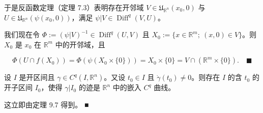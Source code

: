 \begin{theorem}
\begin{subitems}
于是反函数定理（定理 7.3）表明存在开邻域 $ V \in \mathfrak{U}_{\mathbb{R}^{n}}(x_{0}, 0) $ 与 $ U \in \mathfrak{U}_{\mathbb{R}^{n}}(\psi(x_{0}, 0)) $，满足 $ \psi|V \in \operatorname{Diff}^{q}(V, U) $。

\end{subitems}


我们现在令 $ \Phi := (\psi|V)^{-1} \in \operatorname{Diff}^{q}(U, V) $ 且 $ X_{0} := \{x \in \mathbb{R}^{m} ; \ (x, 0) \in V\} $。则 $ X_{0} $ 是 $ x_{0} $ 在 $ \mathbb{R}^{m} $ 中的开邻域，且

\[
\Phi(U \cap f(X_{0})) = \Phi(\psi(X_{0} \times \{0\})) = X_{0} \times \{0\} = V \cap (\mathbb{R}^{m} \times \{0\}) .\quad\blacksquare
\]
\end{theorem}

\begin{corollary}

设 $ I $ 是开区间且 $ \gamma \in C^{q}(I, \mathbb{R}^{n}) $。又设 $ t_{0} \in I $ 且 $ \dot{\gamma}(t_{0}) \ne 0 $。则存在 $ I $ 的含 $ t_{0} $ 的开子区间 $ I_{0} $，使得 $ \gamma|I_{0} $ 的迹是 $ \mathbb{R}^{n} $ 中的嵌入 $ C^{q} $ 曲线。

\proofhead
这立即由定理 9.7 得到。 \nobreak\hspace{0.35em}■
\end{corollary}


